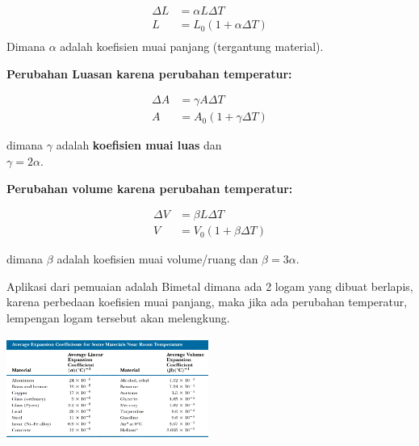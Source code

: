 \documentclass[twocolumn, 11pt]{article}%
\begin{document}
        \begin{equation*}
           \begin{split}
               \Delta L &= \alpha L \Delta T\\
               L &= L_0 (1+\alpha \Delta T)\\
           \end{split} 
        \end{equation*}
        Dimana $\alpha$ adalah koefisien muai panjang (tergantung material).

        \textbf{Perubahan Luasan karena perubahan temperatur:}

        \begin{equation*}
           \begin{split}
               \Delta A &= \gamma A \Delta T\\
               A &= A_0 (1+ \gamma \Delta T)
           \end{split} 
        \end{equation*}

        dimana $\gamma$ adalah \textbf{koefisien muai luas} dan\\
        $\gamma = 2 \alpha$.

        \textbf{Perubahan volume karena perubahan temperatur:}

        \begin{equation*}
            \begin{split}
                \Delta V &= \beta L \Delta T \\
                V &= V_0 (1+ \beta \Delta T)
           \end{split} 
        \end{equation*}

        dimana $\beta$ adalah koefisien muai volume/ruang dan $\beta = 3 \alpha$.

        Aplikasi dari pemuaian adalah Bimetal dimana ada 2 logam yang dibuat berlapis, karena perbedaan koefisien muai panjang, maka jika ada perubahan temperatur, lempengan logam tersebut akan melengkung.

        \begin{center}
            \includegraphics[width=250px]{4.png}
        \end{center}
\end{document}
